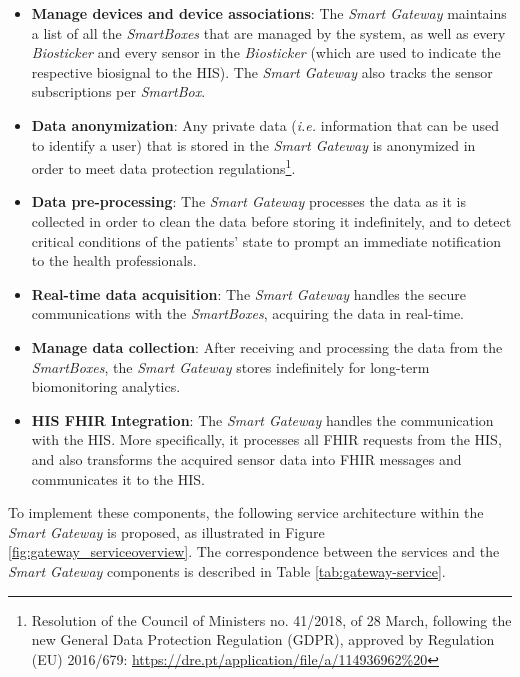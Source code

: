 \begin{itemize}
    \item \textbf{Manage devices and device associations}: The \textit{Smart Gateway} maintains a list of all the \textit{SmartBoxes} that are managed by the system, as well as every \textit{Biosticker} and every sensor in the \textit{Biosticker} (which are used to indicate the respective biosignal to the \acs{HIS}). The \textit{Smart Gateway} also tracks the sensor subscriptions per \textit{SmartBox}.
    \item \textbf{Data anonymization}: Any private data (\textit{i.e.} information that can be used to identify a user) that is stored in the \textit{Smart Gateway} is anonymized in order to meet data protection regulations\footnote{Resolution of the Council of Ministers no. 41/2018, of 28 March, following the new General Data Protection Regulation (GDPR), approved by Regulation (EU) 2016/679:  \url{https://dre.pt/application/file/a/114936962\%20}}. 
    \item \textbf{Data pre-processing}: The \textit{Smart Gateway} processes the data as it is collected in order to clean the data before storing it indefinitely, and to detect critical conditions of the patients' state to prompt an immediate notification to the health professionals.
    \item \textbf{Real-time data acquisition}: The \textit{Smart Gateway} handles the secure communications with the \textit{SmartBoxes}, acquiring the data in real-time.
    \item \textbf{Manage data collection}: After receiving and processing the data from the \textit{SmartBoxes}, the \textit{Smart Gateway} stores indefinitely for long-term biomonitoring analytics.
    \item \textbf{\acs{HIS} \acs{FHIR} Integration}: The \textit{Smart Gateway} handles the communication with the \acs{HIS}. More specifically, it processes all \acs{FHIR} requests from the \acs{HIS}, and also transforms the acquired sensor data into \acs{FHIR} messages and communicates it to the \acs{HIS}. 
\end{itemize}

To implement these components,  the following service architecture within the \textit{Smart Gateway} is proposed, as illustrated in Figure \ref{fig:gateway_serviceoverview}. The correspondence between the services and the \textit{Smart Gateway} components is described in Table \ref{tab:gateway-service}.

